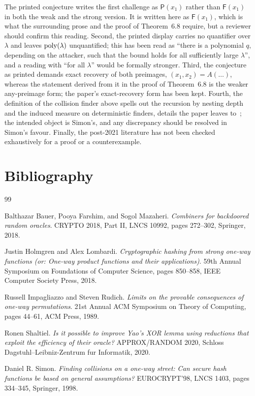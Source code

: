 \documentclass{aicr-conjecture}
\newcommand{\Fs}{\mathsf{F}}          %
\begin{document}
\begin{remark}\label{rem:caveats}
The printed conjecture writes the first challenge as $\mathsf{P}(x_1)$
rather than $\Fs(x_1)$ in both the weak and the strong version. It is
written here as $\Fs(x_1)$, which is what the surrounding prose and the
proof of Theorem~6.8 require, but a reviewer should confirm this
reading. Second, the printed display carries no quantifier over
$\lambda$ and leaves $\mathrm{poly}(\lambda)$ unquantified; this has been read
as ``there is a polynomial $q$, depending on the attacker, such that the
bound holds for all sufficiently large $\lambda$'', and a reading with
``for all $\lambda$'' would be formally stronger. Third, the conjecture
as printed demands exact recovery of both preimages,
$(x_1,x_2)=A(\dots)$, whereas the statement derived from it in the proof
of Theorem~6.8 is the weaker any-preimage form; the paper's
exact-recovery form has been kept. Fourth, the definition of the
collision finder above spells out the recursion by nesting depth and the
induced measure on deterministic finders, details the paper leaves
to~\cite{Sim98}; the intended object is Simon's, and any discrepancy
should be resolved in Simon's favour. Finally, the post-2021 literature
has not been checked exhaustively for a proof or a counterexample.
\end{remark}

\section{Bibliography}

\begin{aicrbibliography}{99}

Balthazar Bauer, Pooya Farshim, and Sogol Mazaheri.
\emph{Combiners for backdoored random oracles}.
CRYPTO 2018, Part II, LNCS 10992, pages 272--302, Springer, 2018.

Justin Holmgren and Alex Lombardi.
\emph{Cryptographic hashing from strong one-way functions (or: One-way
product functions and their applications)}.
59th Annual Symposium on Foundations of Computer Science, pages
850--858, IEEE Computer Society Press, 2018.

Russell Impagliazzo and Steven Rudich.
\emph{Limits on the provable consequences of one-way permutations}.
21st Annual ACM Symposium on Theory of Computing, pages 44--61, ACM
Press, 1989.

Ronen Shaltiel.
\emph{Is it possible to improve Yao's XOR lemma using reductions that
exploit the efficiency of their oracle?}
APPROX/RANDOM 2020, Schloss Dagstuhl--Leibniz-Zentrum fur Informatik,
2020.

Daniel R. Simon.
\emph{Finding collisions on a one-way street: Can secure hash functions
be based on general assumptions?}
EUROCRYPT'98, LNCS 1403, pages 334--345, Springer, 1998.

\end{aicrbibliography}
\end{document}
